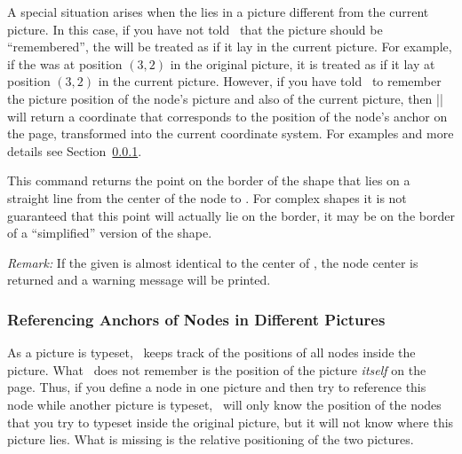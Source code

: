 \begin{command}{\pgfpointanchor{}}
    A special situation arises when the  lies in a picture different
    from the current picture. In this case, if you have not told \pgfname\ that
    the picture should be ``remembered'', the  will be treated as if
    it lay in the current picture. For example, if the  was at
    position $(3,2)$ in the original picture, it is treated as if it lay at
    position $(3,2)$ in the current picture. However, if you have told
    \pgfname\ to remember the picture position of the node's picture and also
    of the current picture, then |\pgfpointanchor| will return a coordinate
    that corresponds to the position of the node's anchor on the page,
    transformed into the current coordinate system. For examples and more
    details see Section~\ref{section-cross-pictures-pgf}.
\end{command}

\begin{command}{\pgfpointshapeborder{}}
    This command returns the point on the border of the shape that lies on a
    straight line from the center of the node to . For complex
    shapes it is not guaranteed that this point will actually lie on the
    border, it may be on the border of a ``simplified'' version of the shape.
\begin{codeexample}[]
\begin{pgfpicture}
  \begin{pgfscope}
  \end{pgfscope}
  \pgfpathcircle{\pgfpoint{2cm}{1cm}}{2pt}
  \pgfpathcircle{\pgfpoint{-1cm}{1cm}}{2pt}
\end{pgfpicture}
\end{codeexample}
    \emph{Remark:} If the given  is almost identical to the center
    of , the node center is returned and a warning message will be
    printed.
\end{command}


\subsubsection{Referencing Anchors of Nodes in Different Pictures}
\label{section-cross-pictures-pgf}

As a picture is typeset, \pgfname\ keeps track of the positions of all nodes
inside the picture. What \pgfname\ does not remember is the position of the
picture \emph{itself} on the page. Thus, if you define a node in one picture
and then try to reference this node while another picture is typeset, \pgfname\
will only know the position of the nodes that you try to typeset inside the
original picture, but it will not know where this picture lies. What is missing
is the relative positioning of the two pictures.

